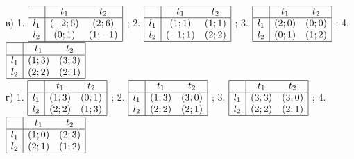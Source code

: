 \begin{problem}
в)	1.  $\begin{array}{|c|cc|}  \hline {} & {t_{1} } & {t_{2} } \\  \hline {l_{1} } & {\left(-2;6\right)} & {\left(2;6\right)} \\ {l_{2} } & {\left(0;1\right)} & {\left(1;-1\right)} \\  \hline  \end{array}$ ; 2.  $\begin{array}{|c|cc|}  \hline {} & {t_{1} } & {t_{2} } \\  \hline {l_{1} } & {\left(1;1\right)} & {\left(1;1\right)} \\ {l_{2} } & {\left(-1;1\right)} & {\left(2;2\right)} \\  \hline  \end{array}$ ; 3.  $\begin{array}{|c|cc|}  \hline {} & {t_{1} } & {t_{2} } \\  \hline {l_{1} } & {\left(2;0\right)} & {\left(0;0\right)} \\ {l_{2} } & {\left(0;1\right)} & {\left(1;2\right)} \\  \hline  \end{array}$ ; 4.  $\begin{array}{|c|cc|}  \hline {} & {t_{1} } & {t_{2} } \\  \hline {l_{1} } & {\left(1;3\right)} & {\left(3;3\right)} \\ {l_{2} } & {\left(2;2\right)} & {\left(2;1\right)} \\  \hline  \end{array}$ \\
г)	1.  $\begin{array}{|c|cc|}  \hline {} & {t_{1} } & {t_{2} } \\  \hline {l_{1} } & {\left(1;3\right)} & {\left(0;1\right)} \\ {l_{2} } & {\left(2;2\right)} & {\left(1;3\right)} \\  \hline  \end{array}$ ; 2.  $\begin{array}{|c|cc|}  \hline {} & {t_{1} } & {t_{2} } \\  \hline {l_{1} } & {\left(1;3\right)} & {\left(3;0\right)} \\ {l_{2} } & {\left(2;2\right)} & {\left(2;1\right)} \\  \hline  \end{array}$ ; 3.  $\begin{array}{|c|cc|}  \hline {} & {t_{1} } & {t_{2} } \\  \hline {l_{1} } & {\left(3;3\right)} & {\left(3;0\right)} \\ {l_{2} } & {\left(2;2\right)} & {\left(2;1\right)} \\  \hline  \end{array}$ ; 4.  $\begin{array}{|c|cc|}  \hline {} & {t_{1} } & {t_{2} } \\  \hline {l_{1} } & {\left(1;0\right)} & {\left(2;3\right)} \\ {l_{2} } & {\left(2;1\right)} & {\left(1;2\right)} \\  \hline  \end{array}$ \\

\end{problem}

